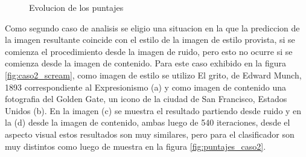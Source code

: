 \documentclass[a4paper,11pt,spanish]{book}
\begin{document}
	\begin{figure}[H]
	  \begin{center}
	  \end{center}
	  \caption{Evolucion de los puntajes}
	  \label{fig:puntajes_caso1}
	\end{figure}

	Como segundo caso de analisis se eligio una situacion en la que la prediccion de la imagen resultante coincide con el estilo de la imagen de estilo provista, si se comienza
	el procedimiento desde la imagen de ruido, pero esto no ocurre si se comienza desde la imagen de contenido.
	Para este caso exhibido en la figura \ref{fig:caso2_scream}, como imagen de estilo se utilizo El grito, de Edward Munch, 1893 correspondiente al Expresionismo (a) y como imagen de contenido una fotografia del Golden Gate, un
	icono de la ciudad de San Francisco, Estados Unidos (b). En la imagen (c) se muestra el resultado partiendo desde ruido y en la (d) desde la imagen de contenido, ambas luego de
	540 iteraciones, desde el aspecto visual estos resultados son muy similares, pero para el clasificador son muy distintos como luego de muestra en la figura \ref{fig:puntajes_caso2}.
\end{document}

